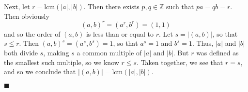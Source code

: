 \documentclass[12pt]{article}
\renewcommand{\qed}{\hfill$\blacksquare$}
\renewenvironment{proof}{\begin{addmargin}[1em]{0em}\begin{newproof}}{\end{newproof}\end{addmargin}\qed}
\begin{document}
\begin{proof}
Next, let $r = \text{lcm}\left(\left|a\right|,\left|b\right|\right)$. Then there exists $p,q \in \mathbb{Z}$ such that $pa=qb=r$. Then obviously $$ \left(a,b\right)^r  = \left(a^r,b^r\right) = \left(1,1\right) $$ and so the order of $\left(a,b\right)$ is less than or equal to $r$. Let $s=\left|\left(a,b\right)\right|$, so that $s\leq r$. Then $\left(a,b\right)^s = \left(a^s,b^s\right) = 1$, so that $a^s=1$ and $b^s=1$. Thus, $\left|a\right|$ and $\left|b\right|$ both divide $s$, making $s$ a common multiple of $\left|a\right|$ and $\left|b\right|$. But $r$ was defined as the smallest such multiple, so we know $r\leq s$. Taken together, we see that $r=s$, and so we conclude that $\left|\left(a,b\right)\right| = \text{lcm}\left(\left|a\right|,\left|b\right|\right)$.
\end{proof}
\end{document}
